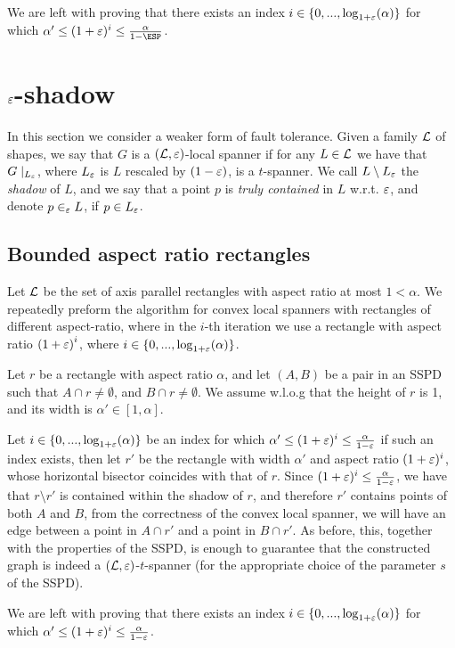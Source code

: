 \documentclass[12pt]{article}%
\begin{document}
We are left with proving that there exists an index
$i\in \{0,...,\log_{1+\varepsilon}(\alpha)\}$ for which
$\alpha' \leq (1+\eps)^i \leq \frac{\alpha}{1-\ESP}$.

\section{$\varepsilon$-shadow}

In this section we consider a weaker form of fault tolerance. Given a family $\mathcal{L}$ of shapes, we say that $G$ is a $(\mathcal{L},\varepsilon)$-local spanner if for any $L\in\mathcal{L}$ we have that $G\mid_{L_{\varepsilon}}$, where $L_{\varepsilon}$ is $L$ rescaled by $(1-\varepsilon)$, is a $t$-spanner. We call $L\setminus L_{\varepsilon}$ the \emph{shadow} of $L$, and we say that a point $p$ is \emph{truly contained} in $L$ w.r.t. $\varepsilon$, and denote $p\in_{\varepsilon} L$, if $p\in L_{\varepsilon}$. 

\subsection{Bounded aspect ratio rectangles}
Let $\mathcal{L}$ be the set of axis parallel rectangles with aspect ratio at most $1<\alpha$. We repeatedly preform the algorithm for convex local spanners with rectangles of different aspect-ratio, where in the $i$-th iteration we use a rectangle with aspect ratio $\left(1+\varepsilon\right)^i$, where $i\in\{0,...,\log_{1+\varepsilon}(\alpha)\}$. 

Let $r$ be a rectangle with aspect ratio $\alpha$, and let $(A,B)$ be a pair in an SSPD such that $A\cap r\neq \emptyset$, and $B\cap r\neq \emptyset$. We assume w.l.o.g that the height of $r$ is 1, and its width is $\alpha'\in [1,\alpha]$.

Let $i\in \{0,...,\log_{1+\varepsilon}(\alpha)\}$ be an index for which $\alpha' \leq (1+\varepsilon)^i \leq \frac{\alpha}{1-\varepsilon}$ if such an index exists, then let $r'$ be the rectangle with width $\alpha'$ and aspect ratio $(1+\varepsilon)^i$, whose horizontal bisector coincides with that of $r$. Since $(1+\varepsilon)^i \leq \frac{\alpha}{1-\varepsilon}$, we have that $r\setminus r'$ is contained within the shadow of $r$, and therefore $r'$ contains points of both $A$ and $B$, from the correctness of the convex local spanner, we will have an edge between a point in $A\cap r'$ and a point in $B\cap r'$. As before, this, together with the properties of the SSPD, is enough to guarantee that the constructed graph is indeed a $(\mathcal{L}, \varepsilon)$-$t$-spanner (for the appropriate choice of the parameter $s$ of the SSPD).

We are left with proving that there exists an index $i\in \{0,...,\log_{1+\varepsilon}(\alpha)\}$ for which $\alpha' \leq (1+\varepsilon)^i \leq \frac{\alpha}{1-\varepsilon}$.
\end{document}
